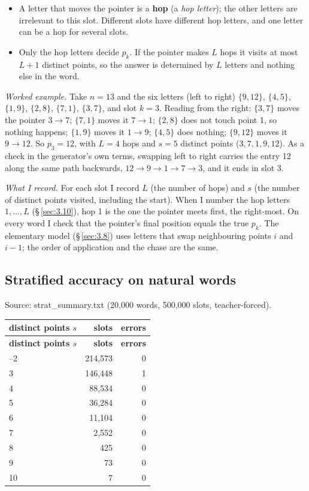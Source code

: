 \documentclass[paper=a4,fontsize=11pt,DIV=11,parskip=half,headings=small,numbers=noendperiod]{scrartcl}
\DeclareRobustCommand{\code}[1]{{\fontseries{m}\ttfamily #1}}
\DeclareRobustCommand{\hdr}[1]{\textsf{\bfseries #1}}
\begin{document}
\begin{itemize}
\item A letter that moves the pointer is a \textbf{hop} (a \emph{hop letter}); the other letters are irrelevant
  to this slot. Different slots have different hop letters, and one letter can be a hop for several slots.
\item Only the hop letters decide $p_k$. If the pointer makes $L$ hops it visits at most $L+1$ distinct points,
  so the answer is determined by $L$ letters and nothing else in the word.
\end{itemize}

\emph{Worked example.} Take $n=13$ and the six letters (left to right) $\{9,12\}$, $\{4,5\}$, $\{1,9\}$,
$\{2,8\}$, $\{7,1\}$, $\{3,7\}$, and slot $k=3$. Reading from the right: $\{3,7\}$ moves the pointer $3\to7$;
$\{7,1\}$ moves it $7\to1$; $\{2,8\}$ does not touch point 1, so nothing happens; $\{1,9\}$ moves it $1\to9$;
$\{4,5\}$ does nothing; $\{9,12\}$ moves it $9\to12$. So $p_3=12$, with $L=4$ hops and $s=5$ distinct points
($3,7,1,9,12$). As a check in the generator’s own terms, swapping left to right carries the entry 12 along the
same path backwards, $12\to9\to1\to7\to3$, and it ends in slot 3.

\emph{What I record.} For each slot I record $L$ (the number of hops) and $s$ (the number of distinct points
visited, including the start). When I number the hop letters $1,\dots,L$ (\S\,\ref{sec:3.10}), hop 1 is the one
the pointer meets first, the right-most. On every word I check that the pointer’s final position equals the true
$p_k$. The elementary model (\S\,\ref{sec:3.8}) uses letters that swap neighbouring points $i$ and $i-1$; the
order of application and the chase are the same.

\subsection{Stratified accuracy on natural words}\label{sec:3.2}
Source: \code{strat\_\allowbreak{}summary.\allowbreak{}txt} (20,000 words, 500,000 slots, teacher-forced).

{\small\nopagebreak[4]
\begin{longtable}{@{}l r r@{}}
\toprule
\hdr{distinct points $s$} & \hdr{slots} & \hdr{errors} \\
\midrule
\endfirsthead
\toprule
\hdr{distinct points $s$} & \hdr{slots} & \hdr{errors} \\
\midrule
\endhead
\bottomrule
\endlastfoot
1–2 & 214,573 & 0 \\
3 & 146,448 & 1 \\
4 & 88,534 & 0 \\
5 & 36,284 & 0 \\
6 & 11,104 & 0 \\
7 & 2,552 & 0 \\
8 & 425 & 0 \\
9 & 73 & 0 \\
10 & 7 & 0 \\
\end{longtable}}
\end{document}

